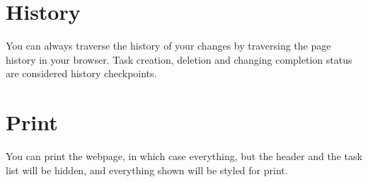 \documentclass{article}
\begin{document}
\section{History}
You can always traverse the history of your changes by traversing the page history in your browser. Task creation, deletion and changing completion status are considered history checkpoints.
\section{Print}
You can print the webpage, in which case everything, but the header and the task list will be hidden, and everything shown will be styled for print.
\end{document}
